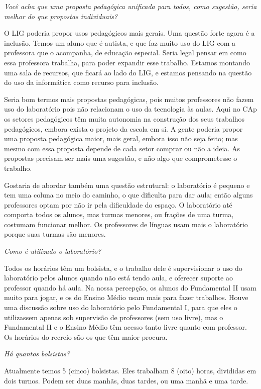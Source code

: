 \textit{Você acha que uma proposta pedagógica unificada para todos, como sugestão, seria melhor do que propostas individuais?}

O LIG poderia propor usos pedagógicos mais gerais. Uma questão forte agora é a inclusão. Temos um aluno que é autista, e que faz muito uso do LIG com a professora que o acompanha, de educação especial. Seria legal pensar em como essa professora trabalha, para poder expandir esse trabalho. Estamos montando uma sala de recursos, que ficará ao lado do LIG, e estamos pensando na questão do uso da informática como recurso para inclusão.

Seria bom termos mais propostas pedagógicas, pois muitos professores não fazem uso do laboratório pois não relacionam o uso da tecnologia às aulas. Aqui no CAp os setores pedagógicos têm muita autonomia na construção dos seus trabalhos pedagógicos, embora exista o projeto da escola em si. A gente poderia propor uma proposta pedagógica maior, mais geral, embora isso não seja feito; mas mesmo com essa proposta depende de cada setor comprar ou não a ideia. As propostas precisam ser mais uma sugestão, e não algo que comprometesse o trabalho.

Gostaria de abordar também uma questão estrutural: o laboratório é pequeno e tem uma coluna no meio do caminho, o que dificulta para dar aula; então alguns professores optam por não ir pela dificuldade do espaço. O laboratório até comporta todos os alunos, mas turmas menores, ou frações de uma turma, costumam funcionar melhor. Os professores de línguas usam mais o laboratório porque suas turmas são menores.

\textit{Como é utilizado o laboratório?}

Todos os horários têm um bolsista, e o trabalho dele é supervisionar o uso do laboratório pelos alunos quando não está tendo aula, e oferecer suporte ao professor quando há aula. Na nossa percepção, os alunos do Fundamental II usam muito para jogar, e os do Ensino Médio usam mais para fazer trabalhos. Houve uma discussão sobre uso do laboratório pelo Fundamental I, para que eles o utilizassem apenas sob supervisão de professores (sem uso livre), mas o Fundamental II e o Ensino Médio têm acesso tanto livre quanto com professor. Os horários do recreio são os que têm maior procura.

\textit{Há quantos bolsistas?}

Atualmente temos 5 (cinco) bolsistas. Eles trabalham 8 (oito) horas, divididas em dois turnos. Podem ser duas manhãs, duas tardes, ou uma manhã e uma tarde.

